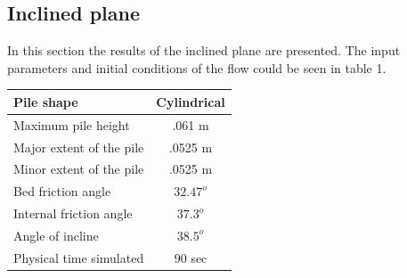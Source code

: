 \documentclass[review]{elsarticle}
\begin{document}
\subsection{Inclined plane}
In this section the results of the inclined plane are presented. The input parameters and initial conditions of the flow could be seen in  table 1.
\begin{center}
        \begin{tabular}{|l|c|}
                \hline
                Pile shape       & Cylindrical \\
                \hline
                Maximum pile height       & .061 m \\
                \hline
                Major extent of the pile  & .0525 m \\
                \hline
                Minor extent of the pile  & .0525 m \\
                \hline           
                Bed friction angle        & $32.47^o$ \\
                \hline
                Internal friction angle  & $37.3^o$ \\
                \hline
                Angle of incline          & $38.5^o$ \\
                \hline
                Physical time simulated   &  90 sec \\
                \hline
        \end{tabular}
\end{center}
\end{document}
